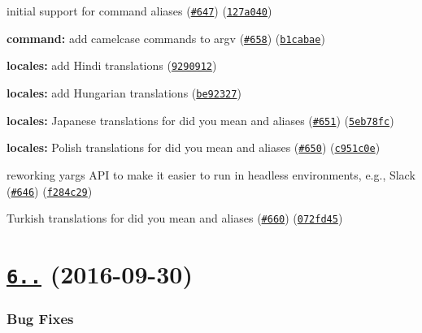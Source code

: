 \begin{DoxyItemize}
\item initial support for command aliases (\href{https://github.com/yargs/yargs/issues/647}{\tt \#647}) (\href{https://github.com/yargs/yargs/commit/127a040}{\tt 127a040})
\item {\bfseries command\+:} add camelcase commands to argv (\href{https://github.com/yargs/yargs/issues/658}{\tt \#658}) (\href{https://github.com/yargs/yargs/commit/b1cabae}{\tt b1cabae})
\item {\bfseries locales\+:} add Hindi translations (\href{https://github.com/yargs/yargs/commit/9290912}{\tt 9290912})
\item {\bfseries locales\+:} add Hungarian translations (\href{https://github.com/yargs/yargs/commit/be92327}{\tt be92327})
\item {\bfseries locales\+:} Japanese translations for \textquotesingle{}did you mean\textquotesingle{} and \textquotesingle{}aliases\textquotesingle{} (\href{https://github.com/yargs/yargs/issues/651}{\tt \#651}) (\href{https://github.com/yargs/yargs/commit/5eb78fc}{\tt 5eb78fc})
\item {\bfseries locales\+:} Polish translations for \textquotesingle{}did you mean\textquotesingle{} and \textquotesingle{}aliases\textquotesingle{} (\href{https://github.com/yargs/yargs/issues/650}{\tt \#650}) (\href{https://github.com/yargs/yargs/commit/c951c0e}{\tt c951c0e})
\item reworking yargs A\+PI to make it easier to run in headless environments, e.\+g., Slack (\href{https://github.com/yargs/yargs/issues/646}{\tt \#646}) (\href{https://github.com/yargs/yargs/commit/f284c29}{\tt f284c29})
\item Turkish translations for \textquotesingle{}did you mean\textquotesingle{} and \textquotesingle{}aliases\textquotesingle{} (\href{https://github.com/yargs/yargs/issues/660}{\tt \#660}) (\href{https://github.com/yargs/yargs/commit/072fd45}{\tt 072fd45})
\end{DoxyItemize}

\label{_6.0.0}%
 \section*{\href{https://github.com/yargs/yargs/compare/v5.0.0...v6.0.0}{\tt 6..} (2016-\/09-\/30)}

\subsubsection*{Bug Fixes}


